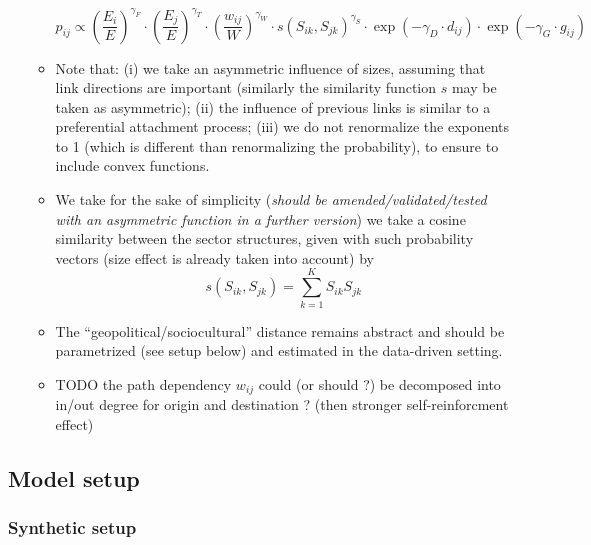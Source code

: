 \documentclass{article}
\begin{document}
\begin{enumerate}
\begin{itemize}
    \begin{equation}
     p_{ij} \propto \left(\frac{E_{i}}{E}\right)^{\gamma_F} \cdot \left(\frac{E_{j}}{E}\right)^{\gamma_T} \cdot \left(\frac{w_{ij}}{W}\right)^{\gamma_W} \cdot s(S_{ik},S_{jk})^{\gamma_S} \cdot \exp \left(- \gamma_D \cdot d_{ij}\right) \cdot \exp \left(- \gamma_G \cdot g_{ij}\right)
    \end{equation}
    
    \item Note that: (i) we take an asymmetric influence of sizes, assuming that link directions are important (similarly the similarity function $s$ may be taken as asymmetric); (ii) the influence of previous links is similar to a preferential attachment process; (iii) we do not renormalize the exponents to 1 (which is different than renormalizing the probability), to ensure to include convex functions.
    \item We take for the sake of simplicity (\textit{should be amended/validated/tested with an asymmetric function in a further version}) we take a cosine similarity between the sector structures, given with such probability vectors (size effect is already taken into account) by
    \begin{equation}
        s\left(S_{ik},S_{jk}\right) = \sum_{k=1}^{K} S_{ik} S_{jk}
    \end{equation}
    
    \item The ``geopolitical/sociocultural'' distance remains abstract and should be parametrized (see setup below) and estimated in the data-driven setting.
    \item %
    TODO the path dependency $w_{ij}$ could (or should ?) be decomposed into in/out degree for origin and destination ? (then stronger self-reinforcment effect)
    \end{itemize}
\end{enumerate}

\subsection{Model setup}

\subsubsection{Synthetic setup}
\end{document}
